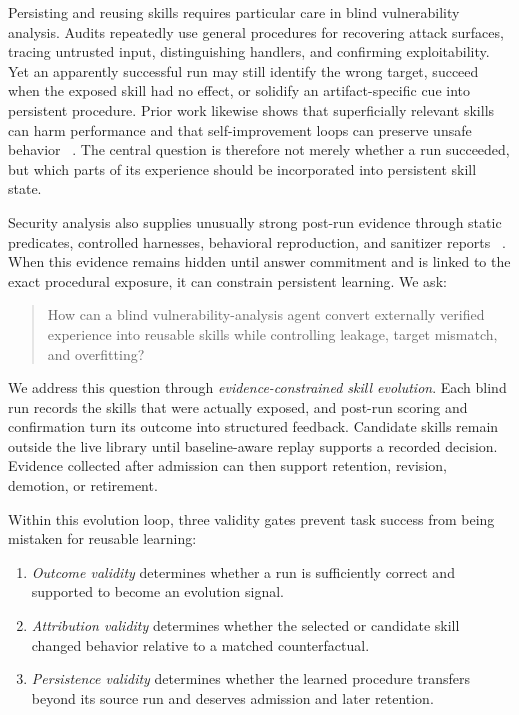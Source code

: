 \documentclass[11pt]{article}
\begin{document}
Persisting and reusing skills requires particular care in blind vulnerability analysis.
Audits repeatedly use general procedures for recovering attack surfaces, tracing
untrusted input, distinguishing handlers, and confirming exploitability.  Yet an
apparently successful run may still identify the wrong target, succeed when the exposed
skill had no effect, or solidify an artifact-specific cue into persistent procedure.
Prior work likewise shows that superficially relevant skills can harm performance and
that self-improvement loops can preserve unsafe behavior
~\cite{skillharmful,misevolution}.  The central question is therefore not merely whether
a run succeeded, but which parts of its experience should be incorporated into
persistent skill state.

Security analysis also supplies unusually strong post-run evidence through static
predicates, controlled harnesses, behavioral reproduction, and sanitizer reports
~\cite{openant,slyp}.  When this evidence remains hidden until answer
commitment and is linked to the exact procedural exposure, it can constrain persistent
learning.  We ask:

\begin{quote}
How can a blind vulnerability-analysis agent convert externally verified experience
into reusable skills while controlling leakage, target mismatch, and overfitting?
\end{quote}

We address this question through \emph{evidence-constrained skill evolution}.  Each blind
run records the skills that were actually exposed, and post-run scoring and confirmation
turn its outcome into structured feedback.  Candidate skills remain outside the live
library until baseline-aware replay supports a recorded decision.  Evidence collected
after admission can then support retention, revision, demotion, or retirement.

Within this evolution loop, three validity gates prevent task success from being
mistaken for reusable learning:

\begin{enumerate}[leftmargin=*]
    \item \emph{Outcome validity} determines whether a run is sufficiently correct and
    supported to become an evolution signal.
    \item \emph{Attribution validity} determines whether the selected or candidate skill
    changed behavior relative to a matched counterfactual.
    \item \emph{Persistence validity} determines whether the learned procedure transfers
    beyond its source run and deserves admission and later retention.
\end{enumerate}
\end{document}
